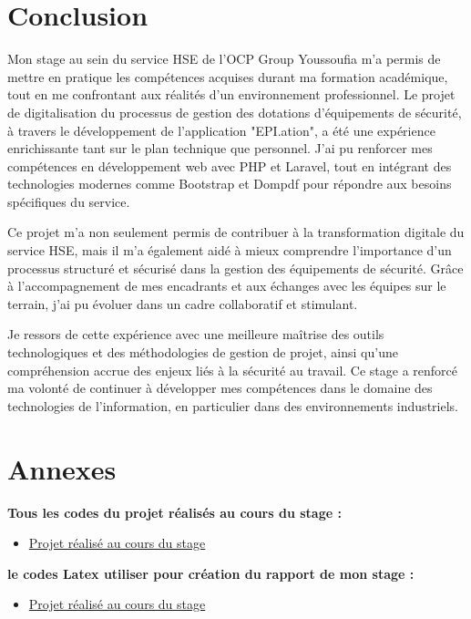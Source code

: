 \documentclass[a4paper,12pt]{report}
\begin{document}
\chapter*{Conclusion}


Mon stage au sein du service HSE de l'OCP Group Youssoufia m’a permis de mettre en pratique les compétences acquises durant ma formation académique, tout en me confrontant aux réalités d’un environnement professionnel. Le projet de digitalisation du processus de gestion des dotations d’équipements de sécurité, à travers le développement de l’application "EPI.ation", a été une expérience enrichissante tant sur le plan technique que personnel. J’ai pu renforcer mes compétences en développement web avec PHP et Laravel, tout en intégrant des technologies modernes comme Bootstrap et Dompdf pour répondre aux besoins spécifiques du service.

Ce projet m'a non seulement permis de contribuer à la transformation digitale du service HSE, mais il m'a également aidé à mieux comprendre l’importance d’un processus structuré et sécurisé dans la gestion des équipements de sécurité. Grâce à l’accompagnement de mes encadrants et aux échanges avec les équipes sur le terrain, j’ai pu évoluer dans un cadre collaboratif et stimulant.

Je ressors de cette expérience avec une meilleure maîtrise des outils technologiques et des méthodologies de gestion de projet, ainsi qu'une compréhension accrue des enjeux liés à la sécurité au travail. Ce stage a renforcé ma volonté de continuer à développer mes compétences dans le domaine des technologies de l’information, en particulier dans des environnements industriels.

\appendix
\chapter*{Annexes}

       \textbf{Tous les codes du projet réalisés au cours du stage :}
       
        \begin{itemize}
        \item \href{https://github.com/ABDOx500/EPI_Intership_1ACI.git}{Projet réalisé au cours du stage}
        \end{itemize}
         \textbf{le codes Latex utiliser pour création du rapport de mon stage :}
         
        \begin{itemize}
        \item \href{https://github.com/ABDOx500/stage_1_ACI.git}{Projet réalisé au cours du stage}
        \end{itemize}
\end{document}

